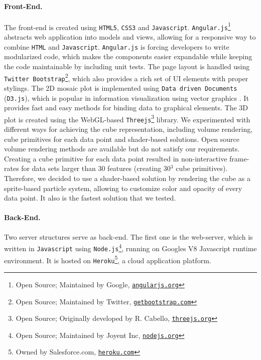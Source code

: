\documentclass[journal]{style/vgtc} 			          %
\begin{document}
\paragraph{Front-End.}
The front-end is created using \texttt{HTML5}, \texttt{CSS3} and \texttt{Javascript}.
\texttt{Angular.js}\footnote{Open Source; Maintained by Google, \href{https://www.angularjs.org/}{\texttt{angularjs.org}}} abstracts web application into models and views, allowing for a responsive way to combine \texttt{HTML} and \texttt{Javascript}.
\texttt{Angular.js} is forcing developers to write modularized code, which makes the components easier expandable while keeping the code maintainable by including unit tests.
The page layout is handled using \texttt{Twitter Bootstrap}\footnote{Open Source; Maintained by Twitter, \href{http://getbootstrap.com}{\texttt{getbootstrap.com}}}, which also provides a rich set of UI elements with proper stylings.
The 2D mosaic plot is implemented using \texttt{Data driven Documents} (\texttt{D3.js}), which is popular in information visualization using vector graphics \cite{D3}.
It provides fast and easy methods for binding data to graphical elements.
The 3D plot is created using the WebGL-based \texttt{Threejs}\footnote{Open Source; Originally developed by R. Cabello, \href{http://threejs.org}{\texttt{threejs.org}}} library.
We experimented with different ways for achieving the cube representation, including volume rendering, cube primitives for each data point and shader-based solutions.
Open source volume rendering methods are available but do not satisfy our requirements.
Creating a cube primitive for each data point resulted in non-interactive frame-rates for data sets larger than 30 features (creating 30$^3$ cube primitives).
Therefore, we decided to use a shader-based solution by rendering the cube as a sprite-based particle system, allowing to customize color and opacity of every data point.
It also is the fastest solution that we tested.

\paragraph{Back-End.}
Two server structures serve as back-end.
The first one is the web-server, which is written in \texttt{Javascript} using \texttt{Node.js}\footnote{Open Source; Maintained by Joyent Inc, \href{http://nodejs.org}{\texttt{nodejs.org}}}, running on Googles V8 Javascript runtime environment.
It is hosted on \texttt{Heroku}\footnote{Owned by Salesforce.com, \href{https://www.heroku.com/}{\texttt{heroku.com}}}, a cloud application platform.
\end{document}
